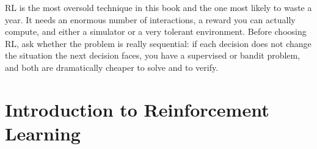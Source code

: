 \begin{engineernote}
RL is the most oversold technique in this book and the one most likely to waste
a year. It needs an enormous number of interactions, a reward you can actually
compute, and either a simulator or a very tolerant environment. Before choosing
RL, ask whether the problem is really sequential: if each decision does not
change the situation the next decision faces, you have a supervised or bandit
problem, and both are dramatically cheaper to solve and to verify.
\end{engineernote}

    \section{Introduction to Reinforcement Learning}


